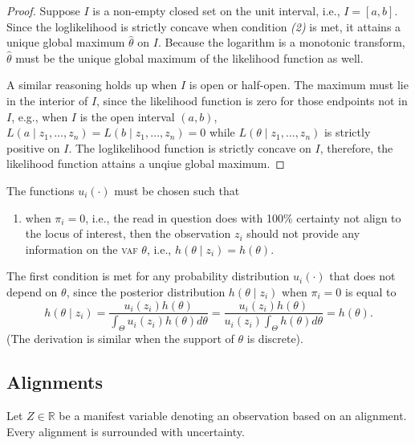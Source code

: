 \documentclass[12pt,a4paper]{article}
\numberwithin{equation}{section}
\begin{document}
\begin{proof}
Suppose $I$ is a non-empty closed set on the unit interval, i.e., $I = [a,b]$. Since the loglikelihood is strictly concave when condition \emph{(2)} is met, it attains a unique global maximum $\widehat{\theta}$ on $I$. Because the logarithm is a monotonic transform, $\widehat{\theta}$ must be the unique global maximum of the likelihood function as well. 

A similar reasoning holds up when $I$ is open or half-open. The maximum must lie in the interior of $I$, since the likelihood function is zero for those endpoints not in $I$, e.g., when $I$ is the open interval $(a,b)$, $L(a \mid z_1, \dots, z_n) = L(b \mid z_1, \dots, z_n) = 0$ while $L(\theta \mid z_1, \dots, z_n)$ is strictly positive on $I$. The loglikelihood function is strictly concave on $I$, therefore, the likelihood function attains a unqiue global maximum. \qedhere 
\end{proof}


The functions $u_i(\cdot)$ must be chosen such that
\begin{enumerate}
 \item when $\pi_i = 0$, i.e., the read in question does with 100\% certainty not align to the locus of interest, then the observation $z_i$ should not provide any information on the \textsc{vaf} $\theta$, i.e., $h(\theta \mid z_i) = h(\theta)$. 
\end{enumerate}
The first condition is met for any probability distribution $u_i(\cdot)$ that does not depend on $\theta$, since the posterior distribution $h(\theta \mid z_i)$ when $\pi_i = 0$ is equal to
\begin{equation}
 h(\theta \mid z_i) = \frac{u_i(z_i) h(\theta)}{\int_\Theta u_i(z_i) h(\theta) d\theta} = \frac{u_i(z_i) h(\theta)}{u_i(z_i) \int_\Theta h(\theta) d\theta} = h(\theta). 
\end{equation}
(The derivation is similar when the support of $\theta$ is discrete).


\subsection{Alignments}

Let $Z \in \mathds{R}$ be a manifest variable denoting an observation based on an alignment. Every alignment is surrounded with uncertainty.  
\end{document}
